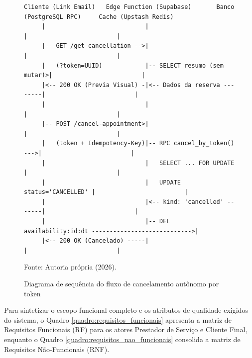 \documentclass[12pt,a4paper]{article}
\begin{document}
\begin{figure}[hbt]
\centering
\begin{lstlisting}
Cliente (Link Email)   Edge Function (Supabase)       Banco (PostgreSQL RPC)     Cache (Upstash Redis)
     |                            |                             |                         |
     |-- GET /get-cancellation -->|                             |                         |
     |   (?token=UUID)            |-- SELECT resumo (sem mutar)>|                         |
     |<-- 200 OK (Previa Visual) -|<-- Dados da reserva --------|                         |
     |                            |                             |                         |
     |-- POST /cancel-appointment>|                             |                         |
     |   (token + Idempotency-Key)|-- RPC cancel_by_token() --->|                         |
     |                            |   SELECT ... FOR UPDATE     |                         |
     |                            |   UPDATE status='CANCELLED' |                         |
     |                            |<-- kind: 'cancelled' -------|                         |
     |                            |-- DEL availability:id:dt ---------------------------->|
     |<-- 200 OK (Cancelado) -----|                             |                         |
\end{lstlisting}
\caption{Diagrama de sequência do fluxo de cancelamento autônomo por token}
\label{fig:seq_cancelamento}
\vspace{0.1cm}
{\footnotesize Fonte: Autoria própria (2026).}
\end{figure}

Para sintetizar o escopo funcional completo e os atributos de qualidade exigidos do sistema, o Quadro \ref{quadro:requisitos_funcionais} apresenta a matriz de Requisitos Funcionais (RF) para os atores Prestador de Serviço e Cliente Final, enquanto o Quadro \ref{quadro:requisitos_nao_funcionais} consolida a matriz de Requisitos Não-Funcionais (RNF).
\end{document}
